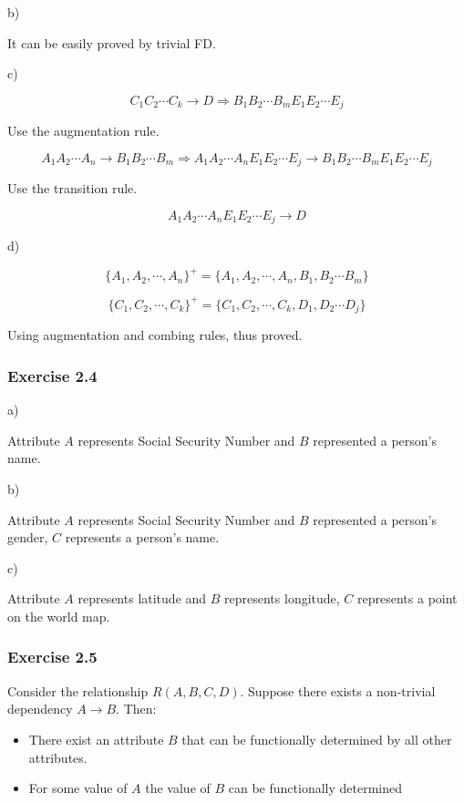 \documentclass[../../main.tex]{subfiles}
\begin{document}
b)

It can be easily proved by trivial FD.

c)

$$
C_{1}C_{2}\cdots C_{k} \to D \Rightarrow B_{1}
B_{2}\cdots B_{m} E_{1}E_{2}\cdots E_{j}
$$

Use the augmentation rule.

$$
A_{1}A_{2}\cdots A_{n} \to B_{1}B_{2} \cdots B_{m}
\Rightarrow A_{1}A_{2}\cdots A_{n}E_{1}E_{2}\cdots E_{j}
\to B_{1}B_{2}\cdots B_{m} E_{1}E_{2}\cdots E_{j}
$$

Use the transition rule.

$$
A_{1}A_{2}\cdots A_{n}E_{1}E_{2}\cdots E_{j} \to D
$$

d)

$$
\{A_{1}, A_{2}, \cdots, A_{n}\} ^ {+} = \{A_{1}, A_{2}, \cdots, A_{n}, B_{1}
,B_{2} \cdots B_{m} \}
$$

$$
\{C_{1}, C_{2}, \cdots, C_{k}\} ^ {+} = \{C_{1}, C_{2}, \cdots, C_{k}, D_{1}
,D_{2} \cdots D_{j} \}
$$

Using augmentation and combing rules, thus proved.

\subsubsection*{Exercise 2.4}

a)

Attribute $A$ represents Social Security Number and $B$
represented a person's name.

b)

Attribute $A$ represents Social Security Number and $B$
represented a person's gender, $C$ represents a person's name.

c)

Attribute $A$ represents latitude and $B$ represents longitude,
$C$ represents a point on the world map.

\subsubsection*{Exercise 2.5}

Consider the relationship $R(A,B,C,D)$. Suppose there exists
a non-trivial dependency $A \to B$. Then:

\begin{itemize}
  \item There exist an attribute $B$ that can be functionally
        determined by all other attributes.
  \item For some value of $A$ the value of $B$ can be functionally
        determined
\end{itemize}
\end{document}
